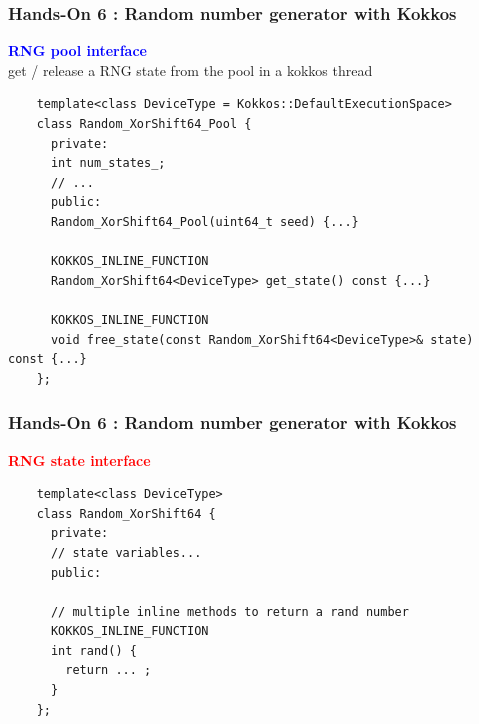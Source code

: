 \begin{frame}[fragile=singleslide]
  \frametitle{Hands-On 6 : Random number generator with Kokkos}

  \textcolor{blue}{\bf \large RNG pool interface}\\
  get / release a RNG state from the pool in a kokkos thread
  \begin{verbatim}
    template<class DeviceType = Kokkos::DefaultExecutionSpace>
    class Random_XorShift64_Pool {
      private:
      int num_states_;
      // ...
      public:
      Random_XorShift64_Pool(uint64_t seed) {...}

      KOKKOS_INLINE_FUNCTION
      Random_XorShift64<DeviceType> get_state() const {...}

      KOKKOS_INLINE_FUNCTION
      void free_state(const Random_XorShift64<DeviceType>& state) const {...}
    };
  \end{verbatim}

\end{frame}

\begin{frame}[fragile=singleslide]
  \frametitle{Hands-On 6 : Random number generator with Kokkos}

  \textcolor{red}{\bf \large RNG state interface}
  \begin{verbatim}
    template<class DeviceType>
    class Random_XorShift64 {
      private:
      // state variables...
      public:

      // multiple inline methods to return a rand number
      KOKKOS_INLINE_FUNCTION
      int rand() {
        return ... ;
      }
    };
  \end{verbatim}

\end{frame}

